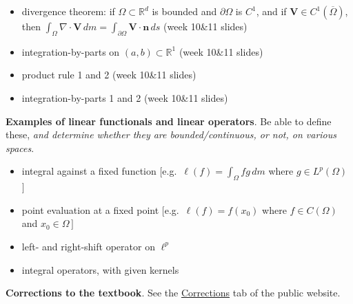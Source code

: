 \documentclass[12pt]{amsart}
\newcommand{\normalspacing}{\renewcommand{\baselinestretch}{1.1}\tiny\normalsize}
\newcommand{\bn}{\mathbf{n}}
\newcommand{\bV}{\mathbf{V}}
\newcommand{\RR}{{\mathbb{R}}}
\newcommand{\Div}{\nabla\cdot}
\begin{document}
\begin{itemize}
\item divergence theorem: if $\Omega\subset \RR^d$ is bounded and $\partial\Omega$ is $C^1$, and if $\bV\in C^1(\overline\Omega)$, then $\int_\Omega \Div\bV\,dm = \int_{\partial\Omega} \bV\cdot \bn\,ds$ (week 10\&11 slides)
\item integration-by-parts on $(a,b) \subset \RR^1$ (week 10\&11 slides) \bap
\item product rule 1 and 2 (week 10\&11 slides)
\item integration-by-parts 1 and 2 (week 10\&11 slides) \bap
\end{itemize}

\normalspacing
\medskip
\noindent \textbf{Examples of linear functionals and linear operators}.  Be able to define these, \emph{and determine whether they are bounded/continuous, or not, on various spaces}.
\begin{itemize}
\item integral against a fixed function $\big[$e.g.~$\ell(f) = \int_\Omega f g\,dm$ where $g\in L^p(\Omega)$ $\big]$
\item point evaluation at a fixed point $\big[$e.g.~$\ell(f) = f(x_0)$ where $f\in C(\Omega)$ and $x_0\in \Omega\,\big]$
\item left- and right-shift operator on $\ell^p$
\item integral operators, with given kernels
\end{itemize}

\normalspacing
\medskip
\noindent \textbf{Corrections to the textbook}.  See the \href{https://bueler.github.io/fa/corrections.html}{Corrections} tab of the public website.
\end{document}
